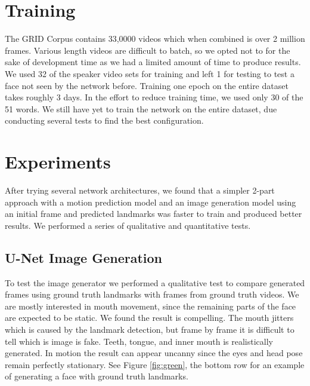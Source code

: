 \documentclass[10pt,twocolumn,letterpaper]{article}
\begin{document}
\section{Training}
 The GRID Corpus contains 33,0000 videos which when combined is over 2 million frames. Various length videos are difficult to batch, so we opted not to for the sake of development time as we had a limited amount of time to produce results. We used 32 of the speaker video sets for training and left 1 for testing to test a face not seen by the network before. Training one epoch on the entire dataset takes roughly 3 days. In the effort to reduce training time, we used only 30 of the 51 words. We still have yet to train the network on the entire dataset, due conducting several tests to find the best configuration.

\section{Experiments}

 After trying several network architectures, we found that a simpler 2-part approach with a motion prediction model and an image generation model using an initial frame and predicted landmarks was faster to train and produced better results. We performed a series of qualitative and quantitative tests. 
 
\subsection{U-Net Image Generation}
 To test the image generator we performed a qualitative test to compare generated frames using ground truth landmarks with frames from ground truth videos. We are mostly interested in mouth movement, since the remaining parts of the face are expected to be static. We found the result is compelling. The mouth jitters which is caused by the landmark detection, but frame by frame it is difficult to tell which is image is fake. Teeth, tongue, and inner mouth is realistically generated. In motion the result can appear uncanny since the eyes and head pose remain perfectly stationary. See Figure \ref*{fig:green}, the bottom row for an example of generating a face with ground truth landmarks.
\end{document}
